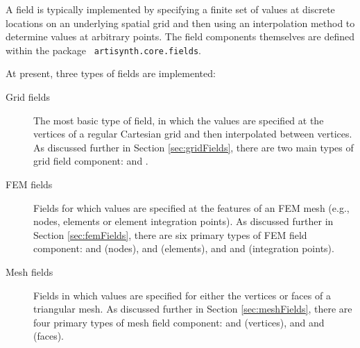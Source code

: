A field is typically implemented by specifying a finite set of values
at discrete locations on an underlying spatial grid and then using an
interpolation method to determine values at arbitrary points. The
field components themselves are defined within the package {\tt
artisynth.core.fields}.

At present, three types of fields are implemented:

\begin{description}

\item[Grid fields]\mbox{}

The most basic type of field, in which the values are specified at the
vertices of a regular Cartesian grid and then interpolated between
vertices. As discussed further in Section \ref{sec:gridFields}, there
are two main types of grid field component:
 and
.

\item[FEM fields]\mbox{}

Fields for which values are specified at the features of an FEM mesh
(e.g., nodes, elements or element integration points).  As discussed
further in Section \ref{sec:femFields}, there are six primary types of
FEM field component:
and
(nodes),
and
(elements), and
and
(integration points).

\item[Mesh fields]\mbox{}

Fields in which values are specified for either the vertices or faces
of a triangular mesh. As discussed
further in Section \ref{sec:meshFields}, there are four primary types of
mesh field component:
and
(vertices), and 
and
(faces).

\end{description}

